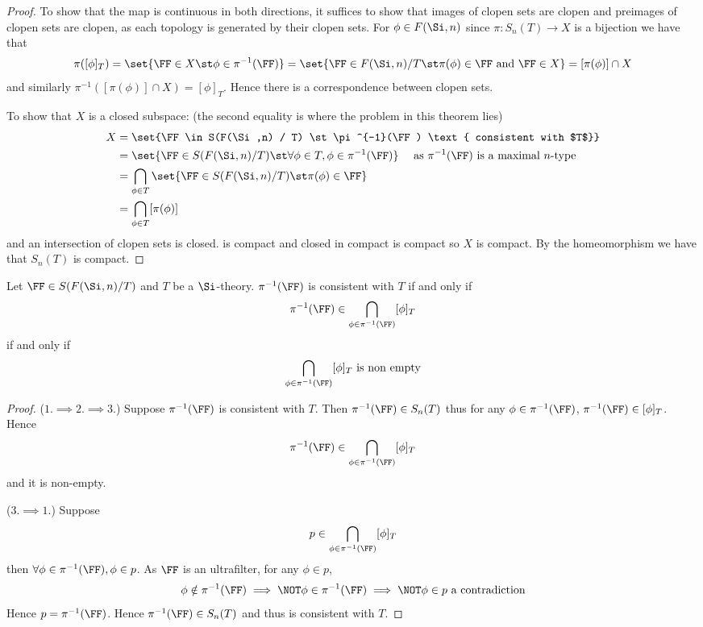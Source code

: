 \begin{proof}
    To show that the map is continuous in both directions,
    it suffices to show that images of clopen sets are clopen and preimages of 
    clopen sets are clopen,
    as each topology is generated by their clopen sets.
    For $\phi \in F(\Si,n)$ since 
    $\pi : S_n(T) \to X$ is a bijection we have that
    \[\pi([\phi]_T) = \set{\FF \in X \st \phi \in \pi^{-1}(\FF)} =
    \set{\FF \in F(\Si,n) / T \st \pi(\phi) \in \FF \text{ and } \FF \in X} = 
    [\pi(\phi)] \cap X\]
    and similarly $\pi^{-1}([\pi(\phi)] \cap X) = [\phi]_T$.
    Hence there is a correspondence between clopen sets.

    To show that $X$ is a closed subspace: 
    (the second equality is where the problem in this theorem lies)%
    \begin{align*}
        X &= 
        \set{\FF \in S(F(\Si,n) / T) \st \pi^{-1}(\FF) 
            \text{ consistent with $T$}}\\
        &= \set{\FF \in S(F(\Si,n) / T) \st \forall \phi \in T, 
        \phi \in \pi^{-1}(\FF)} \quad \text{ as } \pi^{-1}(\FF) 
        \text{ is a maximal $n$-type}\\%
        &= \bigcap_{\phi \in T}\set{\FF \in S(F(\Si,n) / T) 
        \st \pi(\phi) \in \FF}\\
        &= \bigcap_{\phi \in T}[\pi(\phi)]
    \end{align*}
    and an intersection of clopen sets is closed. 
     is compact and 
    closed in compact is compact so $X$ is compact.
    By the homeomorphism we have that $S_n(T)$ is compact.
\end{proof}

\begin{lem}
    Let $\FF \in S(F(\Si,n) / T)$ and $T$ be a $\Si$-theory.
    $\pi^{-1}(\FF)$ is consistent with $T$ if and only if 
    \[\pi^{-1}(\FF) \in \bigcap_{\phi \in \pi^{-1}(\FF)} [\phi]_T\]
    if and only if 
    \[\bigcap_{\phi \in \pi^{-1}(\FF)} [\phi]_T \text{ is non empty}\]
\end{lem}
\begin{proof}
    ($1. \implies 2. \implies 3.$)
        Suppose $\pi^{-1}(\FF)$ is consistent with $T$.
        Then $\pi^{-1}(\FF) \in S_n(T)$ thus for any $\phi \in \pi^{-1}(\FF)$, 
        $\pi^{-1}(\FF) \in [\phi]_T$. 
        Hence 
        \[\pi^{-1}(\FF) \in \bigcap_{\phi \in \pi^{-1}(\FF)} [\phi]_T\]
        and it is non-empty.

    ($3. \implies 1.$)
        Suppose 
        \[p \in \bigcap_{\phi \in \pi^{-1}(\FF)} [\phi]_T\]
        then $\forall \phi \in \pi^{-1}(\FF), \phi \in p$.
        As $\FF$ is an ultrafilter, for any $\phi \in p$, 
        \[\phi \notin \pi^{-1}(\FF) \implies \NOT \phi \in \pi^{-1}(\FF) 
        \implies \NOT \phi \in p \text{ a contradiction}\]
        Hence $p = \pi^{-1}(\FF)$.
        Hence $\pi^{-1}(\FF) \in S_n(T)$ and thus is consistent with $T$.
\end{proof}


